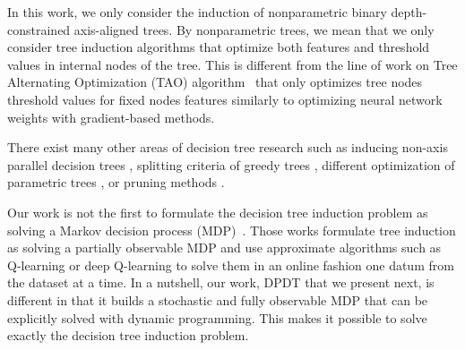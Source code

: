 In this work, we only consider the induction of nonparametric binary depth-constrained axis-aligned trees. By nonparametric trees, we mean that we only consider tree induction algorithms that optimize both features and threshold values in internal nodes of the tree. This is different from the line of work on Tree Alternating Optimization (TAO) algorithm~\cite{NEURIPS2018_185c29dc,9534446,10.1145/3412815.3416882} that only optimizes tree nodes threshold values for fixed nodes features similarly to optimizing neural network weights with gradient-based methods. 

There exist many other areas of decision tree research \cite{loh2014fifty} such as inducing non-axis parallel decision trees \cite{murthy1994system,10.1145/3637528.3671903}, splitting criteria of greedy trees \cite{vanderlinden2024optimalgreedydecisiontrees}, different optimization of parametric trees \cite{NIPS2015_1579779b,10.5555/3327757.3327770}, or pruning methods \cite{pruning1,pruning2}. 

Our work is not the first to formulate the decision tree induction problem as solving a Markov decision process (MDP)~\cite{Dulac_Arnold_2011,garlapati2015reinforcementlearningapproachonline,topin2021iterative,chaouki2024branchesfastdynamicprogramming}. Those works formulate tree induction as solving a partially observable MDP and use approximate algorithms such as Q-learning  \cite{garlapati2015reinforcementlearningapproachonline} or deep Q-learning \cite{topin2021iterative} to solve them in an online fashion one datum from the dataset at a time. In a nutshell, our work, DPDT that we present next, is different in that it builds a stochastic and fully observable MDP that can be explicitly solved with dynamic programming. This makes it possible to solve exactly the decision tree induction problem. 

